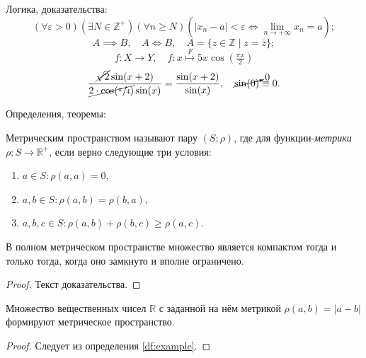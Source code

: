 \documentclass[a4paper, 14pt]{extreport}
\begin{document}
Логика, доказательства:
\begin{equation}
    (\forall \varepsilon > 0) (\exists N \in \mathbb Z^+) (\forall n \ge N) (|x_n - a| < \varepsilon \iff \lim_{n \to +\infty} x_n = a);
\end{equation}
\begin{equation}
    A \implies B, \quad A \iff B, \quad A = \{z \in \mathbb Z \mid z = \bar z \};
\end{equation}
\begin{equation}
    f: X \to Y, \quad f: x \overset{F}{\mapsto} 5x \cos(\tfrac{\pi x}{2})
\end{equation}
\begin{equation}
    \frac{\cancel{\sqrt 2} \sin(x + 2)}{\cancel{2 \cdot \cos(\sfrac{\pi}{4})} \sin(x)} = \frac{\sin(x + 2)}{\sin(x)}, \quad \cancelto{0}{\sin(0)} \equiv 0.
\end{equation}

\newpage
Определения, теоремы:
\begin{Df}\label{df:example}
    Метрическим пространством называют пару $(S; \rho)$, где для функции-\textit{метрики} $\rho: S \to \mathbb R^+$, если верно следующие три условия:
    \begin{enumerate}
        \item $a \in S : \rho(a, a) = 0$,
        \item $a, b \in S : \rho(a, b) = \rho(b, a)$,
        \item $a, b, c \in S : \rho(a, b) + \rho(b, c) \ge \rho(a, c)$.
    \end{enumerate}
\end{Df}


\begin{Th}[Хаусдорф]\label{th:example}
    В полном метрическом пространстве множество является компактом тогда и только тогда, когда оно замкнуто и вполне ограничено.
\end{Th}
\begin{proof}
    Текст доказательства.
\end{proof}

\begin{Ex}
    Множество вещественных чисел $\mathbb R$ с заданной на нём метрикой $\rho(a, b) = |a - b|$ формируют метрическое пространство.
\end{Ex}
\begin{proof}
    Следует из определения \ref{df:example}.
\end{proof}
\end{document}
